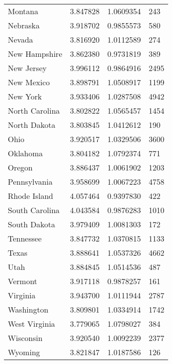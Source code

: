 \documentclass[
]{article}
\begin{document}
\begin{landscape}
\begin{longtable}[t]{llll}
\addlinespace
Montana & 3.847828 & 1.0609354 & 243\\
Nebraska & 3.918702 & 0.9855573 & 580\\
Nevada & 3.816920 & 1.0112589 & 274\\
New Hampshire & 3.862380 & 0.9731819 & 389\\
New Jersey & 3.996112 & 0.9864916 & 2495\\
\addlinespace
New Mexico & 3.898791 & 1.0508917 & 1199\\
New York & 3.933406 & 1.0287508 & 4942\\
North Carolina & 3.802822 & 1.0565457 & 1454\\
North Dakota & 3.803845 & 1.0412612 & 190\\
Ohio & 3.920517 & 1.0329506 & 3600\\
\addlinespace
Oklahoma & 3.804182 & 1.0792374 & 771\\
Oregon & 3.886437 & 1.0061902 & 1203\\
Pennsylvania & 3.958699 & 1.0067223 & 4758\\
Rhode Island & 4.057464 & 0.9397830 & 422\\
South Carolina & 4.043584 & 0.9876283 & 1010\\
\addlinespace
South Dakota & 3.979409 & 1.0081303 & 172\\
Tennessee & 3.847732 & 1.0370815 & 1133\\
Texas & 3.888641 & 1.0537326 & 4662\\
Utah & 3.884845 & 1.0514536 & 487\\
Vermont & 3.917118 & 0.9878257 & 161\\
\addlinespace
Virginia & 3.943700 & 1.0111944 & 2787\\
Washington & 3.809801 & 1.0334914 & 1742\\
West Virginia & 3.779065 & 1.0798027 & 384\\
Wisconsin & 3.920540 & 1.0092239 & 2377\\
Wyoming & 3.821847 & 1.0187586 & 126\\*
\end{longtable}
\end{landscape}
\endgroup{}

\begingroup\fontsize{12}{14}\selectfont
\end{document}
